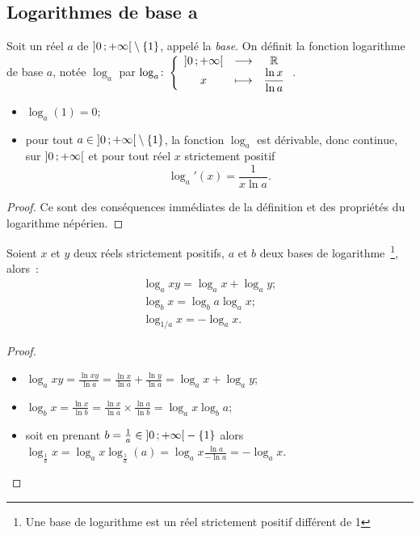 \subsection{Logarithmes de base a}
\label{subsec:chap1-loga}
\begin{defdef}
    Soit un réel \(a\) de \(\left] 0 \, ;  +\infty \right[\setminus\{1\}\), appelé la 
    \emph{base}.  On définit la fonction logarithme de base  \(a\), notée 
    \(\log_a\) par \(\log_a\colon \left\{\begin{array}{ccc} \left] 0 \, ;  +\infty \right[ & \longrightarrow &\mathbb{R}\\ x & \longmapsto & \dfrac{\ln 
    x}{\ln a} \end{array} \right.\).
\end{defdef}
\begin{prop}
    \begin{itemize}
        \item \(\log_a(1)=0\);
        \item pour tout \(a \in\left] 0 \, ;  +\infty \right[\setminus\{1\}\), la fonction 
            \(\log_a\) est dérivable, donc continue, sur \(\left] 0 \, ;  +\infty \right[\) et 
            pour tout réel \(x\) strictement positif
            \begin{equation}
                \log_a'(x)=\frac{1}{x \ln a}.
            \end{equation}
    \end{itemize}
\end{prop}
\begin{proof}
    Ce sont des conséquences immédiates de la définition et des propriétés 
    du logarithme népérien.
\end{proof}
\begin{prop}
    Soient \(x\) et \(y\) deux réels strictement positifs, \(a\) et \(b\) 
    deux bases de logarithme~\footnote{Une base de logarithme est un réel 
    strictement positif différent de 1}, alors~:
    \begin{gather}
        \log_a xy=\log_a x + \log_a y; \\
        \log_b x=\log_ba \log_ax; \\
        \log_{1/a} x=-\log_a x.
    \end{gather}
\end{prop}
\begin{proof}
    \begin{itemize}
        \item \(\log_a xy= \frac{\ln xy}{\ln a}= \frac{\ln x}{\ln a} 
            +\frac{\ln y}{\ln a}=\log_ax+\log_ay\);
        \item \(\log_b x = \frac{\ln x}{\ln b}=\frac{\ln x}{\ln a} \times 
            \frac{\ln a}{\ln b}=\log_ax \log_ba\);
        \item soit en prenant \(b=\frac{1}{a} \in \left] 0 \, ;  +\infty \right[-\{1\}\) alors 
            \(\log_{\frac{1}{a}}x=\log_ax \log_{\frac{1}{a}}(a)=\log_ax 
            \frac{\ln a}{-\ln a}=-\log_ax\).
    \end{itemize}
\end{proof}
